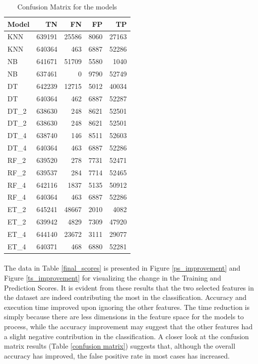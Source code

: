 \begin{table}
    \caption{Confusion Matrix for the models}
    \centering
    \label{confusion_matrix}
    \begin{tabular}{| l | r | r | r | r |}
        \hline
        \textbf{Model} & \textbf{TN} & \textbf{FN} & \textbf{FP} & \textbf{TP} \\
        \hline
        KNN & 639191 & 25586 & 8060 & 27163 \\
        \hline
        KNN & 640364 & 463 & 6887 & 52286 \\
        \hline
        NB & 641671 & 51709 & 5580 & 1040 \\
        \hline
        NB & 637461 & 0 & 9790 & 52749 \\
        \hline
        DT & 642239 & 12715 & 5012 & 40034 \\
        \hline
        DT & 640364 & 462 & 6887 & 52287 \\
        \hline
        DT\_2 & 638630 & 248 & 8621 & 52501 \\
        \hline
        DT\_2 & 638630 & 248 & 8621 & 52501 \\
        \hline
        DT\_4 & 638740 & 146 & 8511 & 52603 \\
        \hline
        DT\_4 & 640364 & 463 & 6887 & 52286 \\
        \hline
        RF\_2 & 639520 & 278 & 7731 & 52471 \\
        \hline
        RF\_2 & 639537 & 284 & 7714 & 52465 \\
        \hline
        RF\_4 & 642116 & 1837 & 5135 & 50912 \\
        \hline
        RF\_4 & 640364 & 463 & 6887 & 52286 \\
        \hline
        ET\_2 & 645241 & 48667 & 2010 & 4082 \\
        \hline
        ET\_2 & 639942 & 4829 & 7309 & 47920 \\
        \hline
        ET\_4 & 644140 & 23672 & 3111 & 29077 \\
        \hline
        ET\_4 & 640371 & 468 & 6880 & 52281 \\
        \hline
    \end{tabular}
\end{table}

\paragraph{}
The data in Table \ref{final_scores} is presented in Figure \ref{ps_improvement} and Figure \ref{ts_improvement} for visualizing the change in the Training and Prediction Scores. It is evident from these results that the two selected features in the dataset are indeed contributing the most in the classification. Accuracy and execution time improved upon ignoring the other features. The time reduction is simply because there are less dimensions in the feature space for the models to process, while the accuracy improvement may suggest that the other features had a slight negative contribution in the classification. A closer look at the confusion matrix results (Table \ref{confusion matrix}) suggests that, although the overall accuracy has improved, the false positive rate in most cases has increased.


